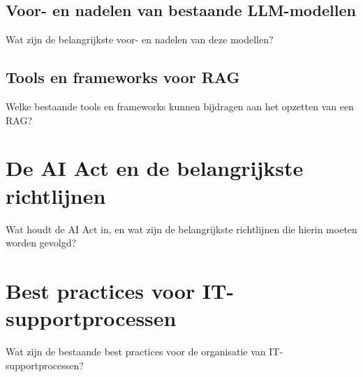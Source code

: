     \subsection{Voor- en nadelen van bestaande LLM-modellen}
    Wat zijn de belangrijkste voor- en nadelen van deze modellen?
    
    \subsection{Tools en frameworks voor RAG}
    Welke bestaande tools en frameworks kunnen bijdragen aan het opzetten van een RAG?

\section{De AI Act en de belangrijkste richtlijnen}
Wat houdt de AI Act in, en wat zijn de belangrijkste richtlijnen die hierin moeten worden gevolgd?

\section{Best practices voor IT-supportprocessen}
Wat zijn de bestaande best practices voor de organisatie van IT-supportprocessen?
